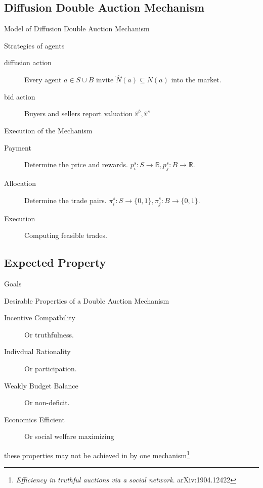 \documentclass{beamer}
\begin{document}
\subsection{Diffusion Double Auction Mechanism}
\begin{frame}{Model of Diffusion Double Auction Mechanism}
	\begin{block}{Strategies of agents}
		\begin{description}
			\item[diffusion action] Every agent $a\in S\cup B$ invite $\hat N(a) \subseteq N(a)$ into the market.
			\item[bid action] Buyers and sellers report valuation $\hat v^b, \hat v^s$
		\end{description}
	\end{block}

	\begin{block}{Execution of the Mechanism}
		\begin{description}
			\item[Payment] Determine the price and rewards.
				$p^s_i: S\to \mathbb{R}, p^s_j: B\to \mathbb{R}$.
			\item[Allocation] Determine the trade pairs.
				$\pi^s_i: S\to \{0,1\}, \pi^s_j: B\to \{0,1\}$.
			\item[Execution] Computing feasible trades.
		\end{description}
	\end{block}
\end{frame}

\subsection{Expected Property}
\begin{frame}{Goals}
	\begin{block}{Desirable Properties of a Double Auction Mechanism}
		\begin{description}
			\item[Incentive Compatbility] Or truthfulness.
			\item[Indivdual Rationality] Or participation.
			\item[Weakly Budget Balance] Or non-deficit.
			\item[Economics Efficient] Or social welfare maximizing
		\end{description}
	\end{block}

	\alert{these properties may not be achieved in by one mechanism\footnote{\textit{Efficiency in truthful auctions via a social network}. arXiv:1904.12422}}
\end{frame}
\end{document}
